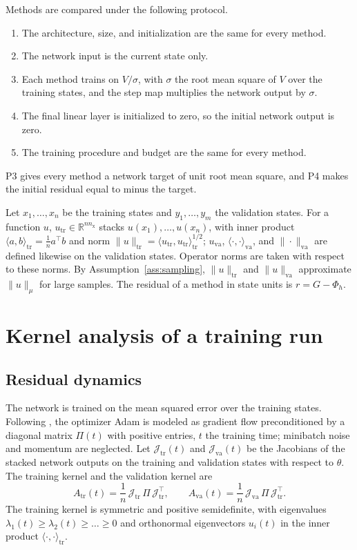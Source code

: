 \documentclass[11pt]{article}
\theoremstyle{definition}
\theoremstyle{remark}
\newcommand{\R}{\mathbb{R}}
\newcommand{\tr}{\mathrm{tr}}
\newcommand{\va}{\mathrm{va}}
\newcommand{\Jac}{\mathcal{J}}
\begin{document}
Methods are compared under the following protocol.
\begin{enumerate}[label=P\arabic*.]
\item The architecture, size, and initialization are the same for every method.
\item The network input is the current state only.
\item Each method trains on $V/\sigma$, with $\sigma$ the root mean square of $V$ over the training states, and the step map multiplies the network output by $\sigma$.
\item The final linear layer is initialized to zero, so the initial network output is zero.
\item The training procedure and budget are the same for every method.
\end{enumerate}
P3 gives every method a network target of unit root mean square, and P4 makes the initial residual equal to minus the target.

Let $x_1,\dots,x_n$ be the training states and $y_1,\dots,y_m$ the validation states.
For a function $u$, $u_\tr \in \R^{nn_{\mathrm x}}$ stacks $u(x_1),\dots,u(x_n)$, with inner product $\langle a,b\rangle_\tr = \tfrac1n a^\top b$ and norm $\|u\|_\tr = \langle u_\tr,u_\tr\rangle_\tr^{1/2}$; $u_\va$, $\langle\cdot,\cdot\rangle_\va$, and $\|\cdot\|_\va$ are defined likewise on the validation states.
Operator norms are taken with respect to these norms.
By Assumption~\ref{ass:sampling}, $\|u\|_\tr$ and $\|u\|_\va$ approximate $\|u\|_\mu$ for large samples.
The residual of a method in state units is $r = G - \Phi_h$.

\section{Kernel analysis of a training run}\label{sec:kernel}

\subsection{Residual dynamics}

The network is trained on the mean squared error over the training states.
Following \cite{ainslie2026spectral}, the optimizer Adam is modeled as gradient flow preconditioned by a diagonal matrix $\Pi(t)$ with positive entries, $t$ the training time; minibatch noise and momentum are neglected.
Let $\Jac_\tr(t)$ and $\Jac_\va(t)$ be the Jacobians of the stacked network outputs on the training and validation states with respect to $\theta$.
The training kernel and the validation kernel are
\begin{equation}\label{eq:kernel}
A_\tr(t) = \frac1n\,\Jac_\tr\,\Pi\,\Jac_\tr^\top, \qquad A_\va(t) = \frac1n\,\Jac_\va\,\Pi\,\Jac_\tr^\top .
\end{equation}
The training kernel is symmetric and positive semidefinite, with eigenvalues $\lambda_1(t) \ge \lambda_2(t) \ge \dots \ge 0$ and orthonormal eigenvectors $u_i(t)$ in the inner product $\langle\cdot,\cdot\rangle_\tr$.
\end{document}
